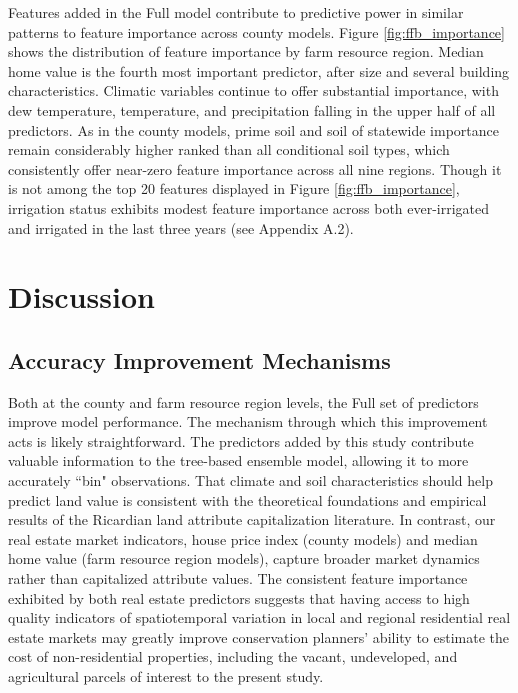 \documentclass[12pt]{article}
\begin{document}
Features added in the Full model contribute to predictive power in similar patterns to feature importance across county models. Figure \ref{fig:ffb_importance} shows the distribution of feature importance by farm resource region. Median home value is the fourth most important predictor, after size and several building characteristics. Climatic variables continue to offer substantial importance, with dew temperature, temperature, and precipitation falling in the upper half of all predictors. As in the county models, prime soil and soil of statewide importance remain considerably higher ranked than all conditional soil types, which consistently offer near-zero feature importance across all nine regions. Though it is not among the top 20 features displayed in Figure \ref{fig:ffb_importance}, irrigation status exhibits modest feature importance across both ever-irrigated and irrigated in the last three years (see Appendix A.2).


\section{Discussion}

\subsection{Accuracy Improvement Mechanisms}

Both at the county and farm resource region levels, the Full set of predictors improve model performance. The mechanism through which this improvement acts is likely straightforward. The predictors added by this study contribute valuable information to the tree-based ensemble model, allowing it to more accurately ``bin" observations. That climate and soil characteristics should help predict land value is consistent with the theoretical foundations and empirical results of the Ricardian land attribute capitalization literature. In contrast, our real estate market indicators, house price index (county models) and median home value (farm resource region models), capture broader market dynamics rather than capitalized attribute values. The consistent feature importance exhibited by both real estate predictors suggests that having access to high quality indicators of spatiotemporal variation in local and regional residential real estate markets may greatly improve conservation planners' ability to estimate the cost of non-residential properties, including the vacant, undeveloped, and agricultural parcels of interest to the present study.
\end{document}
